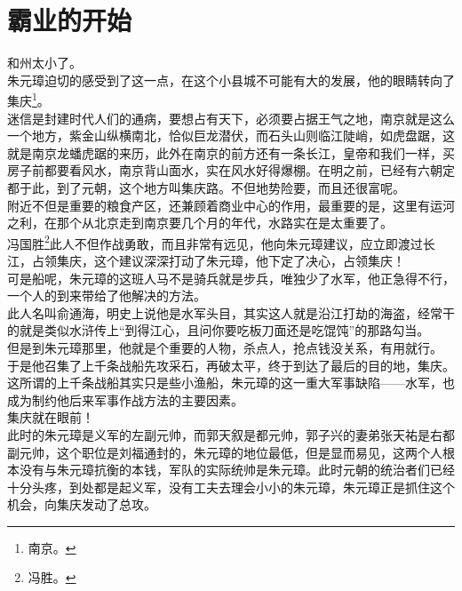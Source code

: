 \section{霸业的开始}
\ifnum{}
	\begin{multicols}{\theparacolNo}
\fi
和州太小了。\\

朱元璋迫切的感受到了这一点，在这个小县城不可能有大的发展，他的眼睛转向了集庆\footnote{南京。}。\\

迷信是封建时代人们的通病，要想占有天下，必须要占据王气之地，南京就是这么一个地方，紫金山纵横南北，恰似巨龙潜伏，而石头山则临江陡峭，如虎盘踞，这就是南京龙蟠虎踞的来历，此外在南京的前方还有一条长江，皇帝和我们一样，买房子前都要看风水，南京背山面水，实在风水好得爆棚。在明之前，已经有六朝定都于此，到了元朝，这个地方叫集庆路。不但地势险要，而且还很富呢。\\

附近不但是重要的粮食产区，还兼顾着商业中心的作用，最重要的是，这里有运河之利，在那个从北京走到南京要几个月的年代，水路实在是太重要了。\\

冯国胜\footnote{冯胜。}此人不但作战勇敢，而且非常有远见，他向朱元璋建议，应立即渡过长江，占领集庆，这个建议深深打动了朱元璋，他下定了决心，占领集庆！\\

可是船呢，朱元璋的这班人马不是骑兵就是步兵，唯独少了水军，他正急得不行，一个人的到来带给了他解决的方法。\\

此人名叫俞通海，明史上说他是水军头目，其实这人就是沿江打劫的海盗，经常干的就是类似水浒传上“到得江心，且问你要吃板刀面还是吃馄饨”的那路勾当。\\

但是到朱元璋那里，他就是个重要的人物，杀点人，抢点钱没关系，有用就行。\\

于是他召集了上千条战船先攻采石，再破太平，终于到达了最后的目的地，集庆。\\

这所谓的上千条战船其实只是些小渔船，朱元璋的这一重大军事缺陷——水军，也成为制约他后来军事作战方法的主要因素。\\

集庆就在眼前！\\

此时的朱元璋是义军的左副元帅，而郭天叙是都元帅，郭子兴的妻弟张天祐是右都副元帅，这个职位是刘福通封的，朱元璋的地位最低，但是显而易见，这两个人根本没有与朱元璋抗衡的本钱，军队的实际统帅是朱元璋。此时元朝的统治者们已经十分头疼，到处都是起义军，没有工夫去理会小小的朱元璋，朱元璋正是抓住这个机会，向集庆发动了总攻。\\


\end{multicols}
